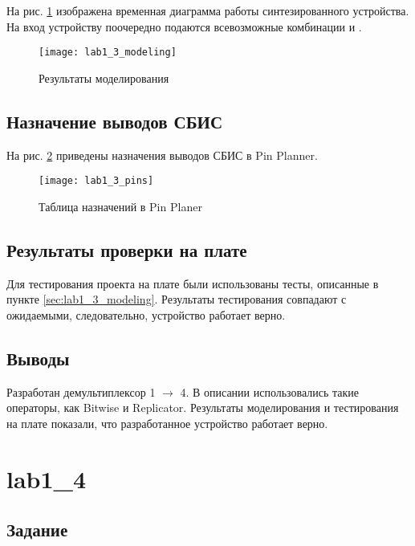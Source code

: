 На рис. \ref{fig:lab1_3_modeling} изображена временная диаграмма работы синтезированного устройства. На вход устройству поочередно подаются всевозможные комбинации  и .
\begin{figure}[H]
\begin{center}
	\texttt{[image: lab1\_3\_modeling]}
	\caption{Результаты моделирования}
	\label{fig:lab1_3_modeling}
\end{center}
\end{figure}

\subsection{Назначение выводов СБИС}

На рис. \ref{fig:lab1_3_pins} приведены назначения выводов СБИС в Pin Planner.

\begin{figure}[H]
\begin{center}
	\texttt{[image: lab1\_3\_pins]}
	\caption{Таблица назначений в Pin Planer}
	\label{fig:lab1_3_pins}
\end{center}
\end{figure}

\subsection{Результаты проверки на плате}

Для тестирования проекта на плате были использованы тесты, описанные в пункте \ref{sec:lab1_3_modeling}. Результаты тестирования совпадают с ожидаемыми, следовательно, устройство работает верно.

\subsection{Выводы}

Разработан демультиплексор 1 $\rightarrow$ 4. В описании использовались такие операторы, как Bitwise и Replicator. Результаты моделирования и тестирования на плате показали, что разработанное устройство работает верно.

\newpage

\section{lab1\_4}

\subsection{Задание}

